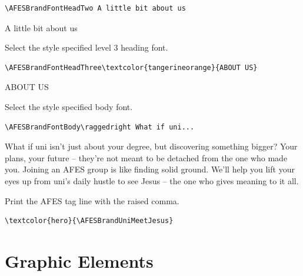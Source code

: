 \documentclass[a4paper]{l3doc}
\begin{document}
\begin{lstlisting}
\AFESBrandFontHeadTwo A little bit about us
\end{lstlisting}

{\AFESBrandFontHeadTwo A little bit about us\par}

\begin{function}{\AFESBrandFontHeadThree}
  Select the style specified level 3 heading font.
\end{function}

\begin{lstlisting}
\AFESBrandFontHeadThree\textcolor{tangerineorange}{ABOUT US}
\end{lstlisting}

\medskip

{\AFESBrandFontHeadThree \textcolor{tangerineorange}{ABOUT US}\par}

\begin{function}{\AFESBrandFontBody}
  Select the style specified body font.
\end{function}

\begin{lstlisting}
\AFESBrandFontBody\raggedright What if uni...
\end{lstlisting}

{\AFESBrandFontBody\raggedright What if uni isn't just about your degree, but
 discovering something bigger? Your plans, your future – they're not meant to
 be detached from the one who made you. Joining an AFES group is like finding
 solid ground. We'll help you lift your eyes up from uni's daily hustle to see
 Jesus – the one who gives meaning to it all.\par}

\begin{function}{\AFESBrandUniMeetJesus}
  Print the AFES tag line with the raised comma.
\end{function}

\begin{lstlisting}
\textcolor{hero}{\AFESBrandUniMeetJesus}
\end{lstlisting}

\medskip

{\centering\textcolor{hero}{\AFESBrandUniMeetJesus}\par}

\section{Graphic Elements}
\end{document}
